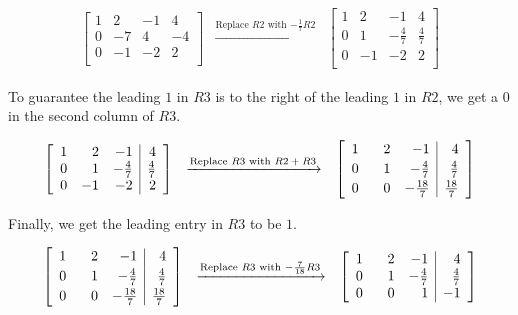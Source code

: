 \begin{ex}
\[\begin{array}{ccc}
\left[ \begin{array}{rrr|r}  
1 & 2 & -1 & 4 \\  
0 & -7 & 4 & -4 \\ 
0 & -1 & -2  & 2 \\ 
\end{array} \right]  
& 
\xrightarrow{\text{Replace $R2$ with $-\frac{1}{7}R2$}}  
& 
\left[ \begin{array}{rrr|r} 
1 & 2 & -1 & 4 \\ 
0 & 1 & -\frac{4}{7} & \frac{4}{7} \\ 
0 & -1 & -2 & 2 \\
\end{array} \right]

\end{array}\]

To guarantee the leading $1$ in $R3$ is to the right of the leading $1$ in $R2$, we get a $0$ in the second column of $R3$.

\[ \begin{array}{ccc}

\left[ \begin{array}{rrr|r} 
1 & 2 & -1 & 4 \\ 
0 & 1 & -\frac{4}{7} & \frac{4}{7} \\ 
0 & -1 & -2 & 2 \\ 
\end{array} \right]  
& 
\xrightarrow{\text{Replace $R3$ with $R2+R3$}} 
&  
\left[ \begin{array}{rrr|r} 
1 & \hphantom{-}2 & -1 & 4 \\ [2pt]
0 & 1 & -\frac{4}{7} & \frac{4}{7} \\ [2pt]
0 & 0 & -\frac{18}{7} & \frac{18}{7} \\ 
\end{array} \right]


\end{array}\]

Finally, we get the leading entry in $R3$ to be $1$.

\[\begin{array}{ccc}

\left[ \begin{array}{rrr|r} 
1 & \hphantom{-}2 & -1 & 4 \\ [2pt]
0 & 1 & -\frac{4}{7} & \frac{4}{7} \\ [2pt]
0 & 0 & -\frac{18}{7} & \frac{18}{7} \\ 
\end{array} \right]   
& 
\xrightarrow{\text{Replace $R3$ with $-\frac{7}{18}R3$}} 
& 
\left[ \begin{array}{rrr|r} 
1 & \hphantom{-}2 & -1 & 4 \\ 
0 & 1 & -\frac{4}{7} & \frac{4}{7} \\ 
0 & 0 &1 & -1 \\ 
\end{array} \right]


\end{array}\]
\end{ex}
